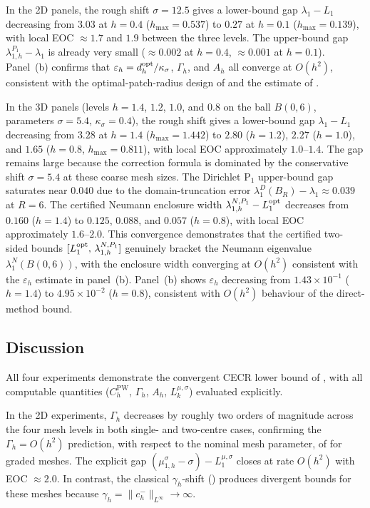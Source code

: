\documentclass[11pt]{article}
\theoremstyle{plain}
\theoremstyle{definition}
\theoremstyle{remark}
\begin{document}
In the 2D panels, the rough shift $\sigma=12.5$ gives a lower-bound
gap $\lambda_1-L_1$ decreasing from $3.03$ at $h=0.4$ ($h_{\max}=0.537$)
to $0.27$ at $h=0.1$ ($h_{\max}=0.139$), with local EOC $\approx 1.7$
and $1.9$ between the three levels.
The upper-bound gap $\lambda_{1,h}^{P_1}-\lambda_1$ is already very small
($\approx 0.002$ at $h=0.4$, $\approx 0.001$ at $h=0.1$).
Panel~(b) confirms that $\varepsilon_h=d_h^{\rm opt}/\kappa_\sigma$,
$\Gamma_h$, and $A_h$ all converge at $O(h^2)$, consistent with the
optimal-patch-radius design of  and the estimate of
.

In the 3D panels (levels $h=1.4$, $1.2$, $1.0$, and $0.8$ on the ball $B(0,6)$,
parameters $\sigma=5.4$, $\kappa_\sigma=0.4$),
the rough shift gives a lower-bound gap $\lambda_1-L_1$ decreasing from
$3.28$ at $h=1.4$ ($h_{\max}=1.442$) to $2.80$ ($h=1.2$), $2.27$ ($h=1.0$),
and $1.65$ ($h=0.8$, $h_{\max}=0.811$), with local EOC approximately $1.0$--$1.4$.
The gap remains large because the correction formula is dominated
by the conservative shift $\sigma=5.4$ at these coarse mesh sizes.
The Dirichlet $\mathrm{P}_1$ upper-bound gap saturates near $0.040$ due to the
domain-truncation error $\lambda_1^D(B_R)-\lambda_1\approx 0.039$ at $R=6$.
The certified Neumann enclosure width $\lambda_{1,h}^{N,P_1}-L_1^{\rm opt}$
decreases from $0.160$ ($h=1.4$) to $0.125$, $0.088$, and $0.057$ ($h=0.8$),
with local EOC approximately $1.6$--$2.0$.
This convergence demonstrates that the certified two-sided bounds
$[L_1^{\rm opt},\,\lambda_{1,h}^{N,P_1}]$ genuinely bracket the Neumann
eigenvalue $\lambda_1^N(B(0,6))$, with the enclosure width converging at
$O(h^2)$ consistent with the $\varepsilon_h$ estimate in panel~(b).
Panel~(b) shows $\varepsilon_h$ decreasing from $1.43{\times}10^{-1}$ ($h=1.4$)
to $4.95{\times}10^{-2}$ ($h=0.8$),
consistent with $O(h^2)$ behaviour of the direct-method bound.

\subsection{Discussion}
\label{subsec:numerics-discussion}

All four experiments demonstrate the convergent CECR lower bound of
, with all computable quantities
($C_h^{\mathrm{PW}}$, $\Gamma_h$, $A_h$, $L_k^{\mu,\sigma}$)
evaluated explicitly.

In the 2D experiments, $\Gamma_h$ decreases by roughly two orders of
magnitude across the four mesh levels in both single- and two-centre
cases, confirming the $\Gamma_h=O(h^2)$ prediction, with respect to the
nominal mesh parameter, of
 for graded meshes.
The explicit gap $(\mu_{1,h}^\sigma{-}\sigma)-L_1^{\mu,\sigma}$ closes at
rate $O(h^2)$ with EOC $\approx 2.0$.
In contrast, the classical $\gamma_h$-shift
() produces divergent bounds for these
meshes because $\gamma_h=\|c_h^-\|_{L^\infty}\to\infty$.
\end{document}

